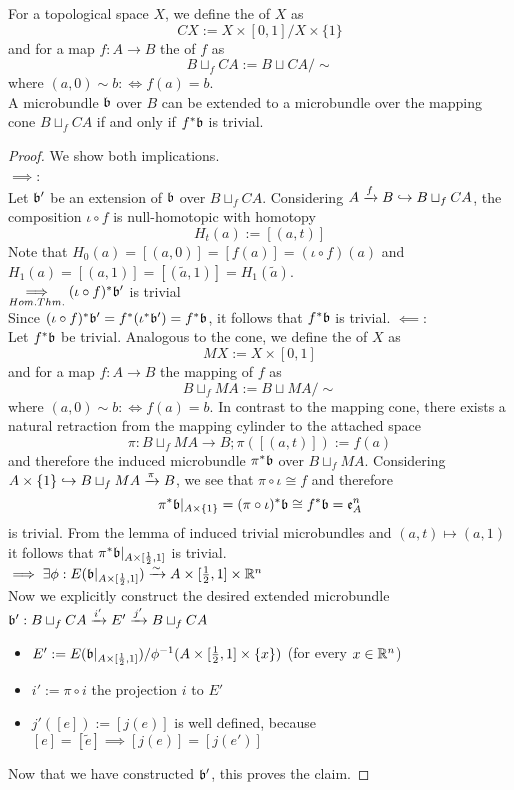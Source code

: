 For a topological space $X$, we define the  of $X$ as 
\[ CX := X \times [0, 1] / X \times \{1\} \]
and for a map $f: A \to B$ the  of $f$ as
\[ B \sqcup_f CA := B \sqcup CA / \sim \]
where $(a, 0) \sim b :\iff f(a) = b$.
 \\
A microbundle $\bb$ over $B$ can be extended to a microbundle over the mapping cone $B \sqcup_f CA$ if and only if $f^*\bb$ is trivial.
\begin{proof}
We show both implications. \\
$\implies$: \\
Let $\bb'$ be an extension of $\bb$ over $B \sqcup_f CA$.
Considering $A \xto{f} B \incl B \sqcup_f CA$, the composition $\iota \circ f$ is null-homotopic with homotopy
\[ H_t(a) := [(a, t)] \]
Note that $H_0(a) = [(a, 0)] = [f(a)] = (\iota \circ f)(a)$ and $H_1(a) = [(a, 1)] = [(\tilde{a}, 1)] = H_1(\tilde{a})$.
\\ $\ximplies{Hom. Thm.} (\iota \circ f)^*\bb'$ is trivial \\
Since $(\iota \circ f)^*\bb' = f^*(\iota^*\bb') = f^*\bb$, it follows that $f^*\bb$ is trivial.
$\impliedby$: \\
Let $f^*\bb$ be trivial.
Analogous to the cone, we define the  of $X$ as
\[ MX := X \times [0, 1] \]
and for a map $f: A \to B$ the mapping  of $f$ as
\[ B \sqcup_f MA := B \sqcup MA / \sim \]
where $(a, 0) \sim b :\iff f(a) = b$.
In contrast to the mapping cone, there exists a natural retraction from the mapping cylinder to the attached space
\[ \pi: B \sqcup_f MA \to B; \pi([(a, t)]) := f(a) \]
and therefore the induced microbundle $\pi^*\bb$ over $B \sqcup_f MA$.
Considering $A \times \{1\} \incl B \sqcup_f MA \xto{\pi} B$, we see that $\pi \circ \iota \cong f$ and therefore
\[ \pi^*\bb\restr{A \times \{1\}} = (\pi \circ \iota)^*\bb \cong f^*\bb = \mathfrak{e}^n_A\]
is trivial. From the lemma of induced trivial microbundles and $(a, t) \mapsto (a, 1)$ it follows that $\pi^*\bb\restr{A \times [\frac{1}{2}, 1]}$ is trivial.
\\ $\implies \exists \phi: E(\bb\restr{A \times [\frac{1}{2}, 1]}) \isomto A \times [\frac{1}{2}, 1] \times \R^n$ \\
Now we explicitly construct the desired extended microbundle $\bundledef{\bb'}{B \sqcup_f CA}{E'}{i'}{j'}$
\begin{itemize}
    \item $E' := E(\bb\restr{A \times [\frac{1}{2}, 1]}) / \phi^{-1}(A \times [\frac{1}{2}, 1] \times \{x\})$ (for every $x \in \R^n$)
    \item $i' := \pi \circ i$ the projection $i$ to $E'$
    \item $j'([e]) := [j(e)]$ is well defined, because $[e] = [\tilde{e}] \implies [j(e)] = [j(e')]$
\end{itemize}
Now that we have constructed $\bb'$, this proves the claim.
\end{proof}